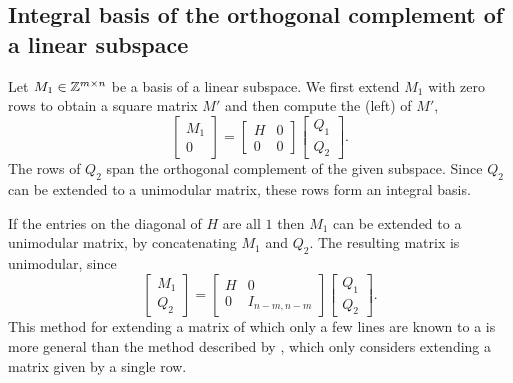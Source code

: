 \subsection{Integral basis of the orthogonal complement of a linear subspace}
\label{s:completion}

Let $M_1 \in \mathbb{Z}^{m \times n}$ be a basis of a linear subspace.
We first extend $M_1$ with zero rows to obtain a square matrix $M'$
and then compute the (left)  of $M'$,
$$
\begin{bmatrix}
M_1 \\ 0
\end{bmatrix}
=
\begin{bmatrix}
H & 0 \\ 0 & 0
\end{bmatrix}
\begin{bmatrix}
Q_1 \\ Q_2
\end{bmatrix}
.
$$
The rows of $Q_2$ span the orthogonal complement of the given subspace.
Since $Q_2$ can be extended to a unimodular matrix, these rows form
an integral basis.

If the entries on the diagonal of $H$ are all $1$ then $M_1$
can be extended to a unimodular matrix, by concatenating $M_1$ and $Q_2$.
The resulting matrix is unimodular, since
$$
\begin{bmatrix}
M_1 \\ Q_2
\end{bmatrix}
=
\begin{bmatrix}
H & 0 \\ 0 & I_{n-m,n-m}
\end{bmatrix}
\begin{bmatrix}
Q_1 \\ Q_2
\end{bmatrix}
.
$$
This method for extending a matrix of which
only a few lines are known to a 
is more general than the method described by ,
which only considers extending a matrix given by a single row.
